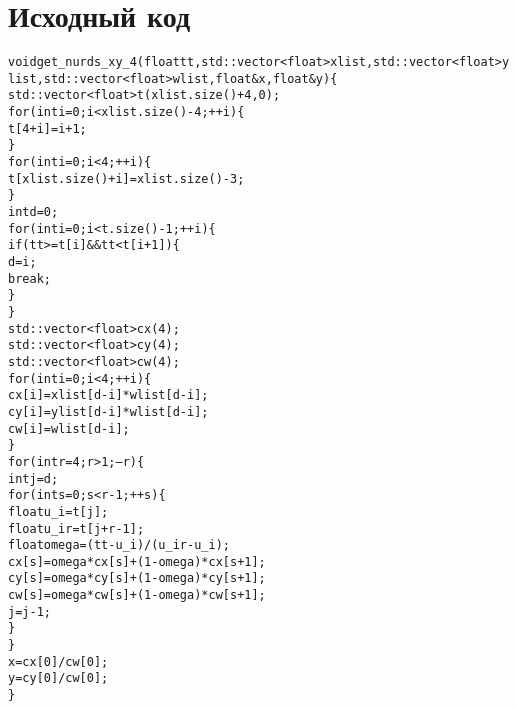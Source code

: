 \section{Исходный код}

\begin{alltt}
    void get_nurds_xy_4(float tt,std::vector<float> xlist,std::vector<float> ylist,std::vector<float> wlist,float &x,float &y)\{
    std::vector<float> t(xlist.size() + 4,0);
    for(int i = 0; i < xlist.size() - 4;++i)\{
        t[4+i] = i+1;
    \}
    for(int i = 0; i < 4; ++i)\{
        t[xlist.size() + i] = xlist.size() - 3;
    \}
    int d = 0;
    for(int i = 0; i < t.size() - 1; ++i)\{
        if(tt >= t[i] && tt < t[i+1])\{
            d = i;
            break;
        \}
    \}
    std::vector<float> cx(4);
    std::vector<float> cy(4);
    std::vector<float> cw(4);
    for(int i = 0; i < 4; ++i)\{
        cx[i] = xlist[d-i]*wlist[d-i];
        cy[i] = ylist[d-i]*wlist[d-i];
        cw[i] = wlist[d-i];
    \}
    for(int r = 4; r > 1; --r)\{
        int j = d;
        for(int s = 0; s < r-1;++s)\{
            float u_i = t[j];
            float u_ir = t[j+r-1];
            float omega = (tt - u_i)/(u_ir - u_i);
            cx[s] = omega*cx[s] + (1 - omega)*cx[s+1];
            cy[s] = omega*cy[s] + (1 - omega)*cy[s+1];
            cw[s] = omega*cw[s] + (1 - omega)*cw[s+1];
            j = j-1;
        \}
    \}
    x = cx[0]/cw[0];
    y = cy[0]/cw[0];
\}
\end{alltt}




